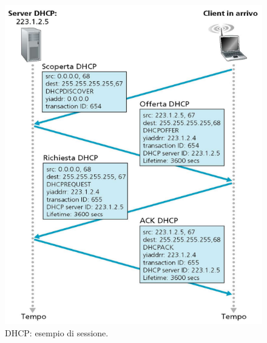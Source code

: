 \documentclass[11pt, italian, openany]{book}
\begin{document}
\begin{sloppypar}
\begin{figure}[!h]
	\centering
	\includegraphics[scale=0.5]{images/dhcp-esempio.png}
	\caption{DHCP: esempio di sessione.}
	\label{fig:dhcp-esempio}
\end{figure}

\end{sloppypar}
\end{document}
